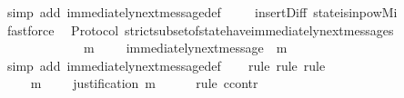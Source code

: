 \begin{isabellebody}
\ {\isacharparenleft}simp\ add{\isacharcolon}\ immediately{\isacharunderscore}next{\isacharunderscore}message{\isacharunderscore}def{\isacharparenright}\ \isanewline
\ \ \isamarkupfalse%
\ insert{\isacharunderscore}Diff\ state{\isacharunderscore}is{\isacharunderscore}in{\isacharunderscore}pow{\isacharunderscore}Mi\ \isamarkupfalse%
\ fastforce%
\endisatagproof
{\isafoldproof}%
%
\isadelimproof
\isanewline
%
\endisadelimproof
\isanewline
\isanewline
{}\isamarkupfalse%
\ {\isacharparenleft}\ Protocol{\isacharparenright}\ strict{\isacharunderscore}subset{\isacharunderscore}of{\isacharunderscore}state{\isacharunderscore}have{\isacharunderscore}immediately{\isacharunderscore}next{\isacharunderscore}messages{\isacharcolon}\ \isanewline
\ \ {\isachardoublequoteopen}{\isasymforall}\ {\isasymsigma}\ {\isasymin}\ {\isasymSigma}{\isachardot}\ {\isasymforall}\ {\isasymsigma}{\isacharprime}{\isachardot}\ {\isasymsigma}{\isacharprime}\ {\isasymsubset}\ {\isasymsigma}\ {\isasymlongrightarrow}\ {\isacharparenleft}{\isasymexists}\ m\ {\isasymin}\ {\isasymsigma}\ {\isacharminus}\ {\isasymsigma}{\isacharprime}{\isachardot}\ immediately{\isacharunderscore}next{\isacharunderscore}message\ {\isacharparenleft}{\isasymsigma}{\isacharprime}{\isacharcomma}\ m{\isacharparenright}{\isacharparenright}{\isachardoublequoteclose}\isanewline
%
\isadelimproof
\ \ %
\endisadelimproof
%
\isatagproof
{}\isamarkupfalse%
\ {\isacharparenleft}simp\ add{\isacharcolon}\ immediately{\isacharunderscore}next{\isacharunderscore}message{\isacharunderscore}def{\isacharparenright}\isanewline
\ \ \isamarkupfalse%
\ {\isacharparenleft}rule{\isacharcomma}\ rule{\isacharcomma}\ rule{\isacharparenright}\isanewline
{}\isamarkupfalse%
\ {\isacharminus}\isanewline
\ \ \isamarkupfalse%
\ {\isasymsigma}\ {\isasymsigma}{\isacharprime}\isanewline
\ \ \isamarkupfalse%
\ {\isachardoublequoteopen}{\isasymsigma}\ {\isasymin}\ {\isasymSigma}{\isachardoublequoteclose}\isanewline
\ \ \isamarkupfalse%
\ {\isachardoublequoteopen}{\isasymsigma}{\isacharprime}\ {\isasymsubset}\ {\isasymsigma}{\isachardoublequoteclose}\isanewline
\ \ \isamarkupfalse%
\ {\isachardoublequoteopen}{\isasymexists}\ m\ {\isasymin}\ {\isasymsigma}\ {\isacharminus}\ {\isasymsigma}{\isacharprime}{\isachardot}\ justification\ m\ {\isasymsubseteq}\ {\isasymsigma}{\isacharprime}{\isachardoublequoteclose}\isanewline
\ \ \isamarkupfalse%
\ {\isacharparenleft}rule\ ccontr{\isacharparenright}\isanewline

\end{isabellebody}
